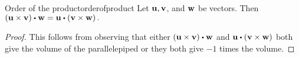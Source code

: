 \begin{proposition}{Order of the product}{orderofproduct}
Let ${\bf u},{\bf v}$, and ${\bf w}$ be vectors. Then $\tup{
\vect{u}\times \vect{v}} \dotprod \vect{w}=\vect{u}\dotprod \tup{\vect{v}\times \vect{w}
} .$
\end{proposition}

\begin{proof}This follows from observing that either 
$\tup{\vect{u}\times \vect{v}} \dotprod \vect{w}$ and $\vect{u}\dotprod 
\tup{\vect{v}\times \vect{w}} $ both give the volume of the parallelepiped or they both
give $-1$ times the volume.
\end{proof}

\begin{comment}
Recall that we can express the cross product as the determinant of a particular matrix. It turns out
that the same can be done for the box product. 
Suppose you have three vectors, $\vect{u}=\begin{mymatrix}{rrr}
a & b & c
\end{mymatrix}^T ,\vect{v}=\begin{mymatrix}{rrr}
 d & e & f
\end{mymatrix}^T ,$ and $\vect{w}=\begin{mymatrix}{rrr}
g & h & i
\end{mymatrix}^T .$ Then the box product $\vect{u}\dotprod \tup{\vect{v}\times \vect{w}}$ is given by the following.
\begin{eqnarray*}
\vect{u}\dotprod \tup{\vect{v}\times \vect{w}} &=&
\begin{mymatrix}{r}
a \\
b \\
c
\end{mymatrix} \dotprod \left|
\begin{array}{rrr}
\vect{i} & \vect{j} & \vect{k} \\
d & e & f \\
g & h & i
\end{array}
\right| \\
&=&a\left|
\begin{array}{rr}
e & f \\
h & i
\end{array}
\right| -b\left|
\begin{array}{rr}
d & f \\
g & i
\end{array}
\right| +c\left|
\begin{array}{rr}
d & e \\
g & h
\end{array}
\right| \\
&= &\det \begin{mymatrix}{rrr}
a & b & c \\
d & e & f \\
g & h & i
\end{mymatrix} 
\end{eqnarray*}


\end{comment}
